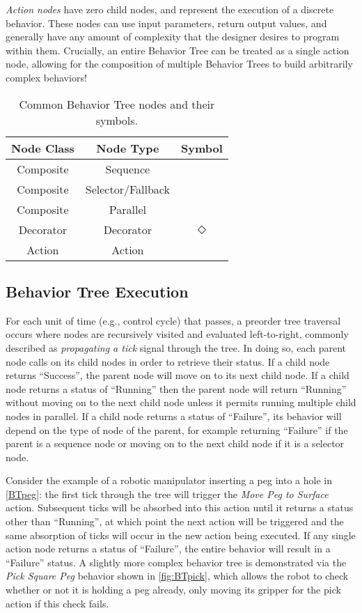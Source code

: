 \textsl{Action nodes} have zero child nodes, and represent the execution of a discrete behavior. These nodes can use input parameters, return output values, and generally have any amount of complexity that the designer desires to program within them. Crucially, an entire Behavior Tree can be treated as a single action node, allowing for the composition of multiple Behavior Trees to build arbitrarily complex behaviors!

\begin{table}[h!]
	\centering
	\begin{tabular}{ ||c c c|| }
		\hline
		\hline
		Node Class & Node Type & Symbol \\
		\hline
		Composite & Sequence & \fbox{$\rightarrow$} \\
		Composite & Selector/Fallback & \fbox{?} \\
		Composite & Parallel & \fbox{$\rightrightarrows$} \\
		Decorator & Decorator & $\Diamond$ \\
		Action & Action & \fbox{Text} \\
		\hline
		\hline
	\end{tabular}
	\caption{Common Behavior Tree nodes and their symbols.}
\end{table}

\subsection{Behavior Tree Execution}
For each unit of time (e.g., control cycle) that passes, a preorder tree traversal occurs where nodes are recursively visited and evaluated left-to-right, commonly described as \textsl{propagating a tick} signal through the tree. In doing so, each parent node calls on its child nodes in order to retrieve their status. If a child node returns ``Success'', the parent node will move on to its next child node. If a child node returns a status of ``Running'' then the parent node will return ``Running'' without moving on to the next child node unless it permits running multiple child nodes in parallel. If a child node returns a status of ``Failure'', its behavior will depend on the type of node of the parent, for example returning ``Failure'' if the parent is a sequence node or moving on to the next child node if it is a selector node.

Consider the example of a robotic manipulator inserting a peg into a hole in \cref{BTpeg}: the first tick through the tree will trigger the \textsl{Move Peg to Surface} action. Subsequent ticks will be absorbed into this action until it returns a status other than ``Running'', at which point the next action will be triggered and the same absorption of ticks will occur in the new action being executed. If any single action node returns a status of ``Failure'', the entire behavior will result in a ``Failure'' status. A slightly more complex behavior tree is demonstrated via the \textsl{Pick Square Peg} behavior shown in \cref{fig:BTpick}, which allows the robot to check whether or not it is holding a peg already, only moving its gripper for the pick action if this check fails.

